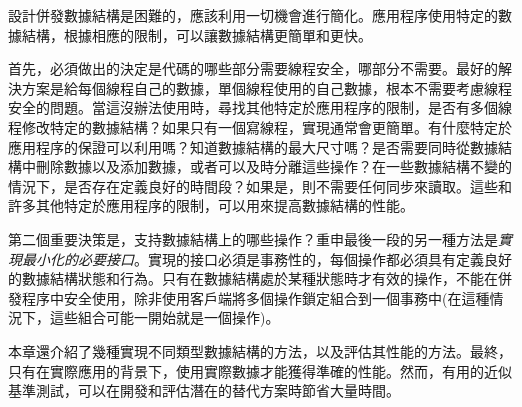設計併發數據結構是困難的，應該利用一切機會進行簡化。應用程序使用特定的數據結構，根據相應的限制，可以讓數據結構更簡單和更快。 

首先，必須做出的決定是代碼的哪些部分需要線程安全，哪部分不需要。最好的解決方案是給每個線程自己的數據，單個線程使用的自己數據，根本不需要考慮線程安全的問題。當這沒辦法使用時，尋找其他特定於應用程序的限制，是否有多個線程修改特定的數據結構？如果只有一個寫線程，實現通常會更簡單。有什麼特定於應用程序的保證可以利用嗎？知道數據結構的最大尺寸嗎？是否需要同時從數據結構中刪除數據以及添加數據，或者可以及時分離這些操作？在一些數據結構不變的情況下，是否存在定義良好的時間段？如果是，則不需要任何同步來讀取。這些和許多其他特定於應用程序的限制，可以用來提高數據結構的性能。 

第二個重要決策是，支持數據結構上的哪些操作？重申最後一段的另一種方法是\textit{實現最小化的必要接口}。實現的接口必須是事務性的，每個操作都必須具有定義良好的數據結構狀態和行為。只有在數據結構處於某種狀態時才有效的操作，不能在併發程序中安全使用，除非使用客戶端將多個操作鎖定組合到一個事務中(在這種情況下，這些組合可能一開始就是一個操作)。

本章還介紹了幾種實現不同類型數據結構的方法，以及評估其性能的方法。最終，只有在實際應用的背景下，使用實際數據才能獲得準確的性能。然而，有用的近似基準測試，可以在開發和評估潛在的替代方案時節省大量時間。 